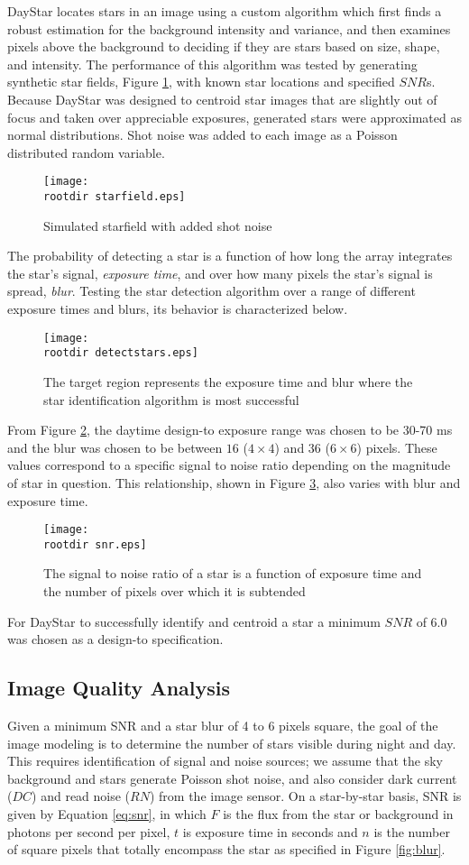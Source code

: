 \documentclass[twocolumn,letterpaper]{IEEEAerospace2012}
\newcommand{\rootdir}{./Figures/}
\newcommand{\RN}{\mathit{RN}}
\newcommand{\DC}{\mathit{DC}}
\begin{document}
DayStar locates stars in an image using a custom algorithm which first finds a robust estimation for the background intensity and variance, and then examines pixels above the background to deciding if they are stars based on size, shape, and intensity. The performance of this algorithm was tested by generating synthetic star fields, Figure \ref{fig:starfield}, with known star locations and specified $SNR$s. Because DayStar was designed to centroid star images that are slightly out of focus and taken over appreciable exposures, generated stars were approximated as normal distributions. Shot noise was added to each image as a Poisson distributed random variable.
\begin{figure}[H]
    \label{fig:starfield}
    \texttt{[image: \\rootdir starfield.eps]}
    \caption{Simulated starfield with added shot noise}
\end{figure}
The probability of detecting a star is a function of how long the array integrates the star's signal, \textit{exposure time}, and over how many pixels the star's signal is spread, \textit{blur}. Testing the star detection algorithm over a range of different exposure times and blurs, its behavior is characterized below.
\begin{figure}[H]
    \label{fig:detectstars}
    \texttt{[image: \\rootdir detectstars.eps]}
    \caption{The target region represents the exposure time and blur where the star identification algorithm is most successful}
\end{figure}
From Figure \ref{fig:detectstars}, the daytime design-to exposure range was chosen to be 30-70 ms and the blur was chosen to be between $16$ ($4 \times 4$) and $36$ ($6 \times 6$) pixels. These values correspond to a specific signal to noise ratio depending on the magnitude of star in question. This relationship, shown in Figure \ref{fig:snr}, also varies with blur and exposure time.
\begin{figure}[H]
    \label{fig:snr}
    \texttt{[image: \\rootdir snr.eps]}
    \caption{The signal to noise ratio of a star is a function of exposure time and the number of pixels over which it is subtended}
\end{figure}

For DayStar to successfully identify and centroid a star a minimum $SNR$ of 6.0 was chosen as a design-to specification.


\subsection{Image Quality Analysis}
Given a minimum SNR and a star blur of 4 to 6 pixels square, the goal of the image modeling is to determine the number of stars visible during night and day. This requires identification of signal and noise sources; we assume that the sky background and stars generate Poisson shot noise, and also consider dark current ($\DC$) and read noise ($\RN$) from the image sensor. On a star-by-star basis, SNR is given by Equation \ref{eq:snr}, in which $F$ is the flux from the star or background in photons per second per pixel, $t$ is exposure time in seconds and $n$ is the number of square pixels that totally encompass the star as specified in Figure \ref{fig:blur}.
\end{document}
